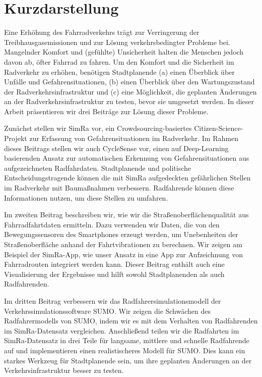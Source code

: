 \afterpage{\null\thispagestyle{empty}\newpage}
\section*{Kurzdarstellung}
Eine Erhöhung des Fahrradverkehrs trägt zur Verringerung der Treibhausgasemissionen und zur Lösung verkehrsbedingter Probleme bei.
Mangelnder Komfort und (gefühlte) Unsicherheit halten die Menschen jedoch davon ab, öfter Fahrrad zu fahren.
Um den Komfort und die Sicherheit im Radverkehr zu erhöhen, benötigen Stadtplanende (a) einen Überblick über Unfälle und Gefahrensituationen, (b) einen Überblick über den Wartungszustand der Radverkehrsinfrastruktur und (c) eine Möglichkeit, die geplanten Änderungen an der Radverkehrsinfrastruktur zu testen, bevor sie umgesetzt werden.
In dieser Arbeit präsentieren wir drei Beiträge zur Lösung dieser Probleme.

Zunächst stellen wir SimRa vor, ein Crowdsourcing-basiertes Citizen-Science-Projekt zur Erfassung von Gefahrensituationen im Radverkehr.
Im Rahmen dieses Beitrags stellen wir auch CycleSense vor, einen auf Deep-Learning basierenden Ansatz zur automatischen Erkennung von Gefahrensituationen aus aufgezeichneten Radfahrdaten.
Stadtplanende und politische Entscheidungstragende können die mit SimRa aufgedeckten gefährlichen Stellen im Radverkehr mit Baumaßnahmen verbessern.
Radfahrende können diese Informationen nutzen, um diese Stellen zu umfahren.

Im zweiten Beitrag beschreiben wir, wie wir die Straßenoberflächenqualität aus Fahrradfahrtdaten ermitteln.
Dazu verwenden wir Daten, die von den Bewegungssensoren des Smartphones erzeugt werden, um Unebenheiten der Straßenoberfläche anhand der Fahrtvibrationen zu berechnen.
Wir zeigen am Beispiel der SimRa-App, wie unser Ansatz in eine App zur Aufzeichnung von Fahrradrouten integriert werden kann.
Dieser Beitrag enthält auch eine Visualisierung der Ergebnisse und hilft sowohl Stadtplanenden als auch Radfahrenden.

Im dritten Beitrag verbessern wir das Radfahrersimulationsmodell der Verkehrssimulationssoftware SUMO.
Wir zeigen die Schwächen des Radfahrermodells von SUMO, indem wir es mit dem Verhalten von Radfahrenden im SimRa-Datensatz vergleichen.
Anschließend teilen wir die Radfahrten im SimRa-Datensatz in drei Teile für langsame, mittlere und schnelle Radfahrende auf und implementieren einen realistischeres Modell für SUMO.
Dies kann ein starkes Werkzeug für Stadtplanende sein, um ihre geplanten Änderungen an der Verkehrsinfrastruktur besser zu testen.
